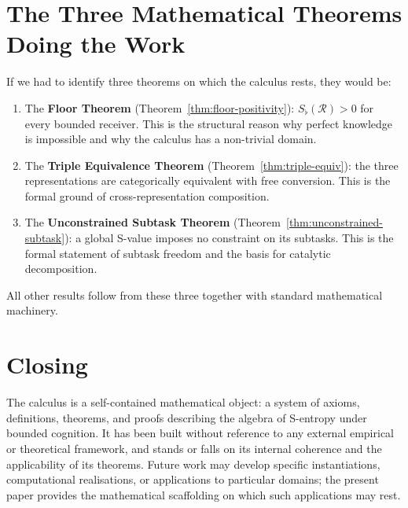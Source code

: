 \documentclass[twocolumn,11pt,a4paper]{article}
\theoremstyle{thmstyle}
\theoremstyle{thmstyle}
\theoremstyle{definition}
\theoremstyle{remark}
\newcommand{\receiver}{\mathcal{R}}
\newcommand{\Sfloor}{S_{\flat}}
\begin{document}
\section{The Three Mathematical Theorems Doing the Work}
\label{sec:three-key-theorems}

If we had to identify three theorems on which the
calculus rests, they would be:

\begin{enumerate}[label=\textbf{T\arabic*.},leftmargin=*]
\item The \textbf{Floor Theorem}
      (Theorem~\ref{thm:floor-positivity}):
      $\Sfloor(\receiver) > 0$ for every bounded
      receiver.  This is the structural reason why
      perfect knowledge is impossible and why the
      calculus has a non-trivial domain.
\item The \textbf{Triple Equivalence Theorem}
      (Theorem~\ref{thm:triple-equiv}): the three
      representations are categorically equivalent
      with free conversion.  This is the formal
      ground of cross-representation composition.
\item The \textbf{Unconstrained Subtask Theorem}
      (Theorem~\ref{thm:unconstrained-subtask}):
      a global S-value imposes no constraint on
      its subtasks.  This is the formal statement
      of subtask freedom and the basis for
      catalytic decomposition.
\end{enumerate}

All other results follow from these three together
with standard mathematical machinery.

\section{Closing}
\label{sec:closing}

The calculus is a self-contained mathematical
object: a system of axioms, definitions,
theorems, and proofs describing the algebra of
S-entropy under bounded cognition.  It has been
built without reference to any external
empirical or theoretical framework, and stands
or falls on its internal coherence and the
applicability of its theorems.  Future work may
develop specific instantiations, computational
realisations, or applications to particular
domains; the present paper provides the
mathematical scaffolding on which such
applications may rest.



\end{document}
